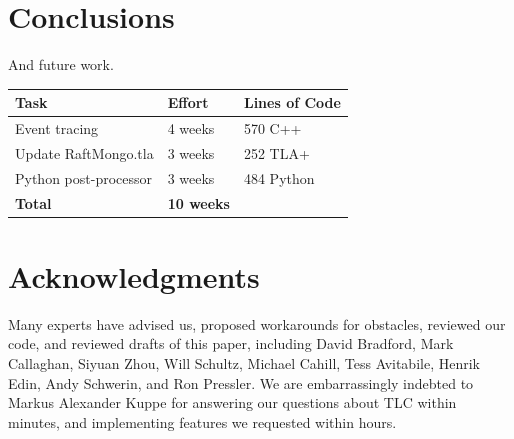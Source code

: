 \documentclass{vldb}
\begin{document}
\section{Conclusions}
\label{sec:conclusions}

And future work.


\begin{center}
\begin{tabular}{ | m{11em} | m{5em}| m{6em} | } 
\hline
Task & Effort & Lines of Code \\  
\hline
Event tracing & 4 weeks & 570 C++ \\ 
Update RaftMongo.tla & 3 weeks & 252 TLA+\\ 
Python post-processor & 3 weeks & 484 Python \\ 
\textbf{Total} & \textbf{10 weeks} & \\
\hline
\end{tabular}
\end{center}


\balance
\section{Acknowledgments}
\label{sec:acknowledgments}
Many experts have advised us, proposed workarounds for obstacles, reviewed our code, and reviewed drafts of this paper, including 
David Bradford,
Mark Callaghan,
Siyuan Zhou,
Will Schultz,
Michael Cahill,
Tess Avitabile,
Henrik Edin,
Andy Schwerin,
and Ron Pressler.
We are embarrassingly indebted to Markus Alexander Kuppe for answering our questions about TLC within minutes, and implementing features we requested within hours.


\end{document}

